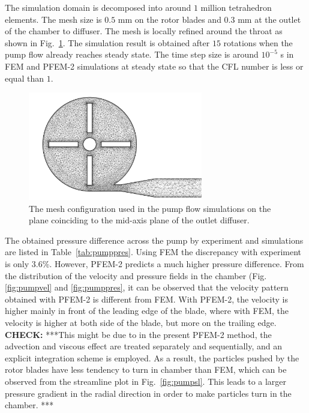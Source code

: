 The simulation domain is decomposed into around $1$ million tetrahedron elements. The mesh size is $0.5$ mm on the rotor blades and $0.3$ mm at the outlet of the chamber to diffuser. The mesh is locally refined around the throat as shown in Fig.~\ref{fig:pumpmesh}. The simulation result is obtained after $15$ rotations when the pump flow already reaches steady state. The time step size is around $10^{-5}$ s in FEM and PFEM-2 simulations at steady state so that the CFL number is less or equal than $1$.  

\begin{figure}[htbp]
    \centering
    \includegraphics[width=3in]{imgs/nozzle_pump/pump_mesh_2.pdf}
    \caption{The mesh configuration used in the pump flow simulations on the plane coinciding to the mid-axis plane of the outlet diffuser.}
    \label{fig:pumpmesh}
\end{figure}

The obtained pressure difference across the pump by experiment and simulations are listed in Table~\ref{tab:pumppres}. Using FEM the discrepancy with experiment is only $3.6$\%. However, PFEM-2 predicts a much higher pressure difference. From the distribution of the velocity and pressure fields in the chamber (Fig. \ref{fig:pumpvel} and \ref{fig:pumppres}, it can be observed that the velocity pattern obtained with PFEM-2 is different from FEM. With PFEM-2, the velocity is higher mainly in front of the leading edge of the blade, where with FEM, the velocity is higher at both side of the blade, but more on the trailing edge. \textbf{CHECK:} ***This might be due to in the present PFEM-2 method, the advection and viscous effect are treated separately and sequentially, and an explicit integration scheme is employed. As a result, the particles pushed by the rotor blades have less tendency to turn in chamber than FEM, which can be observed from the streamline plot in Fig.~\ref{fig:pumpsl}. This leads to a larger pressure gradient in the radial direction in order to make particles turn in the chamber. ***

